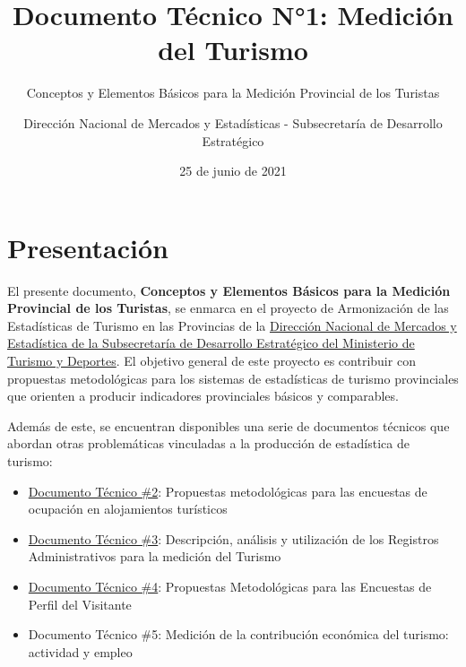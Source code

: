 \documentclass[
]{book}
\title{Documento Técnico N°1: Medición del Turismo}
\subtitle{Conceptos y Elementos Básicos para la Medición Provincial de los Turistas}
\author{Dirección Nacional de Mercados y Estadísticas - Subsecretaría de Desarrollo Estratégico}
\date{25 de junio de 2021}
\let\oldmaketitle\maketitle
\begin{document}
\maketitle


\newpage

\let\maketitle\oldmaketitle
\maketitle

{
\setcounter{tocdepth}{1}
\tableofcontents
}
\hypertarget{presentaciuxf3n}{%
\chapter*{Presentación}\label{presentaciuxf3n}}

El presente documento, \textbf{Conceptos y Elementos Básicos para la Medición Provincial de los Turistas}, se enmarca en el proyecto de Armonización de las Estadísticas de Turismo en las Provincias de la \href{http://datos.yvera.gob.ar/}{Dirección Nacional de Mercados y Estadística de la Subsecretaría de Desarrollo Estratégico del Ministerio de Turismo y Deportes}. El objetivo general de este proyecto es contribuir con propuestas metodológicas para los sistemas de estadísticas de turismo provinciales que orienten a producir indicadores provinciales básicos y comparables.

Además de este, se encuentran disponibles una serie de documentos técnicos que abordan otras problemáticas vinculadas a la producción de estadística de turismo:

\begin{itemize}
\item
  \href{https://dnme-minturdep.github.io/DT2_encuestas/}{Documento Técnico \#2}: Propuestas metodológicas para las encuestas de ocupación en alojamientos turísticos
\item
  \href{https://dnme-minturdep.github.io/DT3_registros_adminsitrativos/}{Documento Técnico \#3}: Descripción, análisis y utilización de los Registros Administrativos para la medición del Turismo
\item
  \href{https://dnme-minturdep.github.io/DT4_perfiles/}{Documento Técnico \#4}: Propuestas Metodológicas para las Encuestas de Perfil del Visitante
\item
  Documento Técnico \#5: Medición de la contribución económica del turismo: actividad y empleo
\end{itemize}
\end{document}
